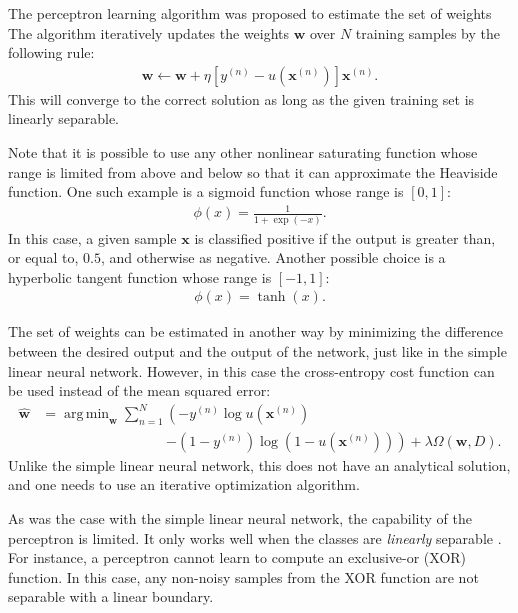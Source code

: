 \documentclass[dissertation,nocontribution]{aaltoseries}
\newcommand{\vect}[1]{\mathbf{#1}}
\newcommand{\vx}[0]{\vect{x}}
\newcommand{\vw}[0]{\vect{w}}
\DeclareMathOperator*{\argmin}{arg\,min}
\begin{document}
The perceptron learning algorithm was proposed  to estimate
the set of weights
The algorithm iteratively updates the
weights $\vw$ over $N$ training samples by the following
rule:
\begin{align*}
    \vw \leftarrow \vw + \eta \left[ y^{(n)} -
    u\left(\vx^{(n)}\right)
    \right] \vx^{(n)}.
\end{align*}
This will converge to the correct solution as long as the
given training set is linearly separable.

Note that it is possible to use any other nonlinear saturating
function whose range is limited from above and below so that it
can approximate the Heaviside function. One such example is a
sigmoid function whose range is
$\left[ 0, 1 \right]$:
\begin{align}
    \label{eq:sigmoid}
    \phi(x) = \frac{1}{1 + \exp\left( -x\right)}.
\end{align}
In this case, a given sample $\vx$ is classified positive if
the output is greater than, or equal to, $0.5$, and
otherwise as negative. 
Another possible choice is a
hyperbolic tangent function whose range is $\left[ -1, 1
\right]$:
\begin{align}
    \label{eq:tanh}
    \phi(x) = \tanh(x).
\end{align}

The set of weights can be estimated in another way by
minimizing the difference between the desired output and the
output of the network, just like in the simple linear neural
network. However, in this case the cross-entropy cost
function \citep[see, e.g.][]{Bishop2006} can be used instead
of the mean squared error:
\begin{align}
    \label{eq:crossentropy_cost}
    \hat{\vw} &= \argmin_{\vw} \sum_{n=1}^N \left(-y^{(n)}
    \log u\left(\vx^{(n)}\right)\right.
    \nonumber\\
    &\phantom{= \argmin_{\vw} \sum_{n=1}^N}\left.-\left(1-y^{(n)}\right)
    \log\left( 1 - 
    u\left(\vx^{(n)}\right)\right)\right) 
    + \lambda \Omega
    \left(\vw, D\right).
\end{align}
Unlike the simple linear neural network, this does not have
an analytical solution, and one needs to use an iterative
optimization algorithm.

As was the case with the simple linear neural network, the
capability of the perceptron is limited. It only works well
when the classes are \textit{linearly} separable \citep[see,
e.g.,][]{Minsky1969}. For instance, a perceptron cannot
learn to compute an exclusive-or
(XOR) function. In this
case, any non-noisy samples from the XOR function are not
separable with a linear boundary.
\end{document}
